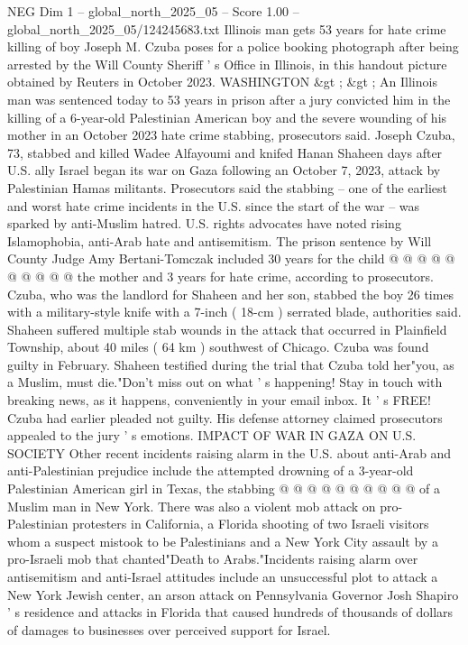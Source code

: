 \begin{textsample}{NEG Dim 1 – global\_north\_2025\_05 – Score 1.00 – global\_north\_2025\_05/124245683.txt}  \label{ex:f1_neg_080}
Illinois man gets 53 years for hate crime killing of boy Joseph M.
Czuba poses for a police booking photograph after being arrested by the Will County Sheriff ' s Office in Illinois, in this handout picture obtained by Reuters in October 2023.
WASHINGTON \&gt ; \&gt ; An Illinois man was sentenced today to 53 years in prison after a jury convicted him in the killing of a 6-year-old Palestinian American boy and the severe wounding of his mother in an October 2023 hate crime stabbing, prosecutors said.
Joseph Czuba, 73, stabbed and killed Wadee Alfayoumi and knifed Hanan Shaheen days after U.S. ally Israel began its war on Gaza following an October 7, 2023, attack by Palestinian Hamas militants.
Prosecutors said the stabbing -- one of the earliest and worst hate crime incidents in the U.S. since the start of the war -- was sparked by anti-Muslim hatred.
U.S. rights advocates have noted rising Islamophobia, anti-Arab hate and antisemitism.
The prison sentence by Will County Judge Amy Bertani-Tomczak included 30 years for the child @ @ @ @ @ @ @ @ @ @ the mother and 3 years for hate crime, according to prosecutors.
Czuba, who was the landlord for Shaheen and her son, stabbed the boy 26 times with a military-style knife with a 7-inch ( 18-cm ) serrated blade, authorities said.
Shaheen suffered multiple stab wounds in the attack that occurred in Plainfield Township, about 40 miles ( 64 km ) southwest of Chicago.
Czuba was found guilty in February.
Shaheen testified during the trial that Czuba told her"you, as a Muslim, must die."Don't miss out on what ' s happening!
Stay in touch with breaking news, as it happens, conveniently in your email inbox.
It ' s FREE!
Czuba had earlier pleaded not guilty.
His defense attorney claimed prosecutors appealed to the jury ' s emotions.
IMPACT OF WAR IN GAZA ON U.S.
SOCIETY Other recent incidents raising alarm in the U.S. about anti-Arab and anti-Palestinian prejudice include the attempted drowning of a 3-year-old Palestinian American girl in Texas, the stabbing @ @ @ @ @ @ @ @ @ @ of a Muslim man in New York.
There was also a violent mob attack on pro-Palestinian protesters in California, a Florida shooting of two Israeli visitors whom a suspect mistook to be Palestinians and a New York City assault by a pro-Israeli mob that chanted"Death to Arabs."Incidents raising alarm over antisemitism and anti-Israel attitudes include an unsuccessful plot to attack a New York Jewish center, an arson attack on Pennsylvania Governor Josh Shapiro ' s residence and attacks in Florida that caused hundreds of thousands of dollars of damages to businesses over perceived support for Israel.

\end{textsample}
